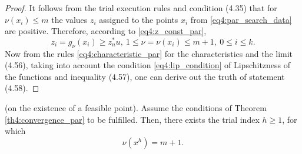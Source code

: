 \begin{proof}
  It follows from the trial execution rules and condition (4.35) that for $\nu(x_i )\le m$ the values $z_i$ assigned to the points $x_i$ from \eqref{eq4:par_search_data} are positive. Therefore, according to \eqref{eq4:z_const_par},
  \begin{displaymath}
    z_i=g_\nu(x_i)\ge z^*_nu,\:1\le\nu=\nu(x_i)\le m+1,\: 0\le i\le k.
  \end{displaymath}
    Now from the rules \eqref{eq4:characteristic_par} for the characteristics and the limit (4.56), taking into account the condition \eqref{eq4:lip_condition} of Lipschitzness of the functions and inequality (4.57), one can derive out the truth of statement (4.58).
\end{proof}
\begin{lemma}
  \label{lm4:2}
  (on the existence of a feasible point). Assume the conditions of Theorem \ref{th4:convergence_par} to be fulfilled. Then, there exists the trial index $h\ge 1$, for which
  \begin{equation}
    \label{eq4:62}
    \nu(x^h)=m+1.
  \end{equation}
\end{lemma}
